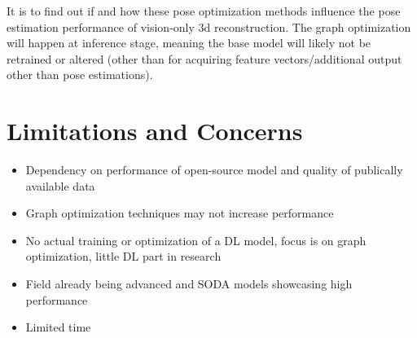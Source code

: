 \documentclass[10.5pt,a4paper]{article}
\begin{document}
\noindent It is to find out if and how these pose optimization methods influence the pose estimation performance of vision-only 3d reconstruction. The graph optimization will happen at inference stage, meaning the base model will likely not be retrained or altered (other than for acquiring feature vectors/additional output other than pose estimations).

\section{Limitations and Concerns}
\begin{itemize}
\item Dependency on performance of open-source model and quality of publically available data
\item Graph optimization techniques may not increase performance
\item No actual training or optimization of a DL model, focus is on graph optimization, little DL part in research
\item Field already being advanced and SODA models showcasing high performance
\item Limited time
\end{itemize}



\end{document}
